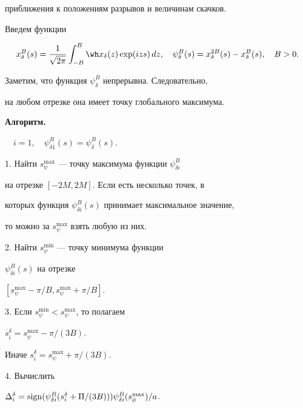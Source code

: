приближения к положениям разрывов и величинам скачков.





Введем функции


$$


x^B_\delta (s)=\frac{1}{\sqrt{2\pi}}\int_{-B}^{B}\wh


x_\delta(z)\exp(izs)\,dz,\quad


\psi^B_{\delta } (s)=x^{2B}_\delta (s)-x^B_\delta(s),\quad


B>0.


$$


Заметим, что функция $\psi^B_{\delta }$ непрерывна. Следовательно,


на любом отрезке она имеет точку глобального максимума.





{\bf Алгоритм.}


$\quad i=1,\quad \psi^B_{\delta 1}(s)=\psi^B_{\delta}(s)$.





1. Найти $s^{\max}_{\psi}$ --- точку максимума функции $\psi^B_{\delta i}$


на отрезке $[-2M,2M]$. Если есть несколько точек, в


которых функция $\psi^B_{\delta i} (s)$ принимает максимальное значение,


то можно за $s^{\max}_{\psi}$ взять любую из них.





2. Найти $s^{\min}_{\psi}$ --- точку минимума функции


$\psi^B_{\delta i} (s)$ на отрезке


$[s^{\max}_{\psi}-\pi/B, s^{\max}_{\psi}+\pi/B]$.





3. Если $s^{\min}_{\psi}< s^{\max}_{\psi}$, то полагаем


$s_i^\delta=s^{\max}_{\psi}-\pi/(3B)$.


Иначе $s_i^\delta=s^{\max}_{\psi}+\pi/(3B)$.





4. Вычислить


$\Delta_i^\delta =\sign(\psi^B_{\delta i}(s^\delta_i+\Pi/(3B)))


\psi^B_{\delta i}(s^{\max}_{\phi})/a$.





